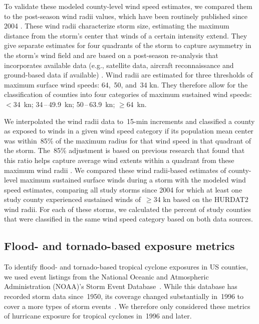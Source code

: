 To validate these modeled county-level wind speed estimates, we compared them
to the  post-season wind radii values, which have been routinely published
since 2004 \parencite{knaff2016using}. These wind radii characterize storm
size, estimating the maximum distance from the storm's center that winds of a
certain intensity extend. They give separate estimates for four quadrants of
the storm to capture asymmetry in the storm's wind field and are 
based on a post-season
re-analysis that incorporates available data (e.g., satellite data, aircraft
reconnaissance and ground-based data if available)
\parencite{knaff2016using}. Wind radii are estimated
for three thresholds of maximum surface wind speeds: 64,~50, and~34 \si{\knot}.
They therefore allow for the classification of counties into four categories of
maximum sustained wind speeds: $<$34~\si{\knot}; 34\,--\,49.9~\si{\knot};
50\,--\,63.9~\si{\knot}; $\ge$64~\si{\knot}. 

We interpolated the wind radii data to~15-\si{\minute} increments and
classified a county as exposed to winds in a given wind speed category if its
population mean center was within~85\% of the maximum radius for that wind
speed in that quadrant of the storm. The~85\% adjustment is based on previous
research that found that this ratio helps capture average wind extents within a
quadrant from these maximum wind radii \parencite{knaff2016using}.  We compared
these wind radii-based estimates of county-level maximum sustained surface
winds during a storm with the modeled wind speed estimates, comparing all study
storms since 2004 for which at least one study county experienced sustained
winds of~$\ge$34 \si{\knot} based on the \ac{HURDAT2} wind radii. For each of
these storms, we calculated the percent of study counties that were classified
in the same wind speed category based on both data sources.

\subsection*{Flood- and tornado-based exposure metrics}

To identify flood- and tornado-based tropical cyclone exposures in \ac{US}
counties, we used event listings from the National Oceanic and Atmospheric
Administration (NOAA)'s Storm Event Database~\parencite{stormevents}. While
this database has recorded storm data since~1950, its coverage changed
substantially in~1996 to cover a more types of storm
events~\parencite{stormevents}. We therefore only considered these metrics of
hurricane exposure for tropical cyclones in~1996 and later.

